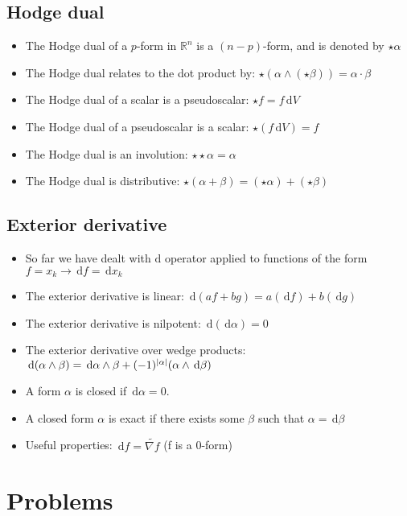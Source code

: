 \documentclass[a4paper,11pt]{report}
\newcommand{\real}{\ensuremath{\mathbb{R}}}
\newcommand{\diff}{\ensuremath{\, \mathrm{d}}}
\DeclarePairedDelimiter{\abs}{\lvert}{\rvert}
\begin{document}
\section{Hodge dual}
\begin{itemize} \itemsep -2pt
    \item The Hodge dual of a $p$-form in $\real^n$ is a $(n - p)$-form, and is denoted by $\star \alpha$
    \item The Hodge dual relates to the dot product by: $\star (\alpha \wedge (\star \beta)) = \alpha \cdot \beta$
    \item The Hodge dual of a scalar is a pseudoscalar: $\star f = f \diff V$
    \item The Hodge dual of a pseudoscalar is a scalar: $\star (f \diff V) = f$
    \item The Hodge dual is an involution: $\star \star \alpha = \alpha$
    \item The Hodge dual is distributive: $\star (\alpha + \beta) = (\star \alpha) + (\star \beta)$
\end{itemize}

\section{Exterior derivative}
\begin{itemize} \itemsep -2pt
    \item So far we have dealt with $\mathrm{d}$ operator applied to functions of the form $f = x_k \to \diff f = \diff x_k$
    \item The exterior derivative is linear: $\diff (a f + b g) = a (\diff f) + b (\diff g)$
    \item The exterior derivative is nilpotent: $\diff (\diff \alpha) = 0$
    \item The exterior derivative over wedge products: $\diff (\alpha \wedge \beta) = \diff \alpha \wedge \beta + (-1)^{\abs{\alpha}} (\alpha \wedge \diff \beta)$
    \item A form $\alpha$ is closed if $\diff \alpha = 0$.
    \item A closed form $\alpha$ is exact if there exists some $\beta$ such that $\alpha = \diff \beta$
    \item Useful properties:
        $\diff f = \widetilde{\nabla f}$ (f is a 0-form)
\end{itemize}

\chapter{Problems}
\end{document}
